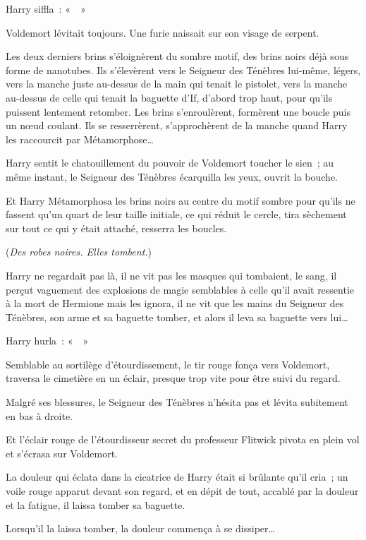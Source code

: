 Harry siffla~: «~~»

Voldemort lévitait toujours. Une furie naissait sur son visage de serpent.

Les deux derniers brins s'éloignèrent du sombre motif, des brins noirs déjà sous forme de nanotubes. Ils s'élevèrent vers le Seigneur des Ténèbres lui-même, légers, vers la manche juste au-dessus de la main qui tenait le pistolet, vers la manche au-dessus de celle qui tenait la baguette d'If, d'abord trop haut, pour qu'ils puissent lentement retomber. Les brins s'enroulèrent, formèrent une boucle puis un nœud coulant. Ils se resserrèrent, s'approchèrent de la manche quand Harry les raccourcit par Métamorphose…

Harry sentit le chatouillement du pouvoir de Voldemort toucher le sien~; au même instant, le Seigneur des Ténèbres écarquilla les yeux, ouvrit la bouche.

Et Harry Métamorphosa les brins noirs au centre du motif sombre pour qu'ils ne fassent qu'un quart de leur taille initiale, ce qui réduit le cercle, tira sèchement sur tout ce qui y était attaché, resserra les boucles.

(\emph{Des robes noires. Elles tombent.})

Harry ne regardait pas là, il ne vit pas les masques qui tombaient, le sang, il perçut vaguement des explosions de magie semblables à celle qu'il avait ressentie à la mort de Hermione mais les ignora, il ne vit que les mains du Seigneur des Ténèbres, son arme et sa baguette tomber, et alors il leva sa baguette vers lui…

Harry hurla~: «~~»

Semblable au sortilège d'étourdissement, le tir rouge fonça vers Voldemort, traversa le cimetière en un éclair, presque trop vite pour être suivi du regard.

Malgré ses blessures, le Seigneur des Ténèbres n'hésita pas et lévita subitement en bas à droite.

Et l'éclair rouge de l'étourdisseur secret du professeur Flitwick pivota en plein vol et s'écrasa sur Voldemort.

La douleur qui éclata dans la cicatrice de Harry était si brûlante qu'il cria~; un voile rouge apparut devant son regard, et en dépit de tout, accablé par la douleur et la fatigue, il laissa tomber sa baguette.

Lorsqu'il la laissa tomber, la douleur commença à se dissiper…
